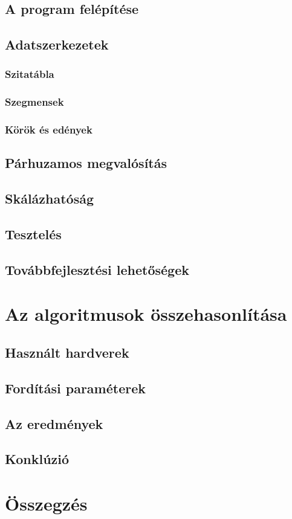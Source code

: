 \documentclass[twoside, a4paper, 12pt]{article}
\begin{document}
\subsection{A program felépítése}

\subsection{Adatszerkezetek}

\subsubsection{Szitatábla}
\subsubsection{Szegmensek}
\subsubsection{Körök és edények}

\subsection{Párhuzamos megvalósítás}

\subsection{Skálázhatóság}

\subsection{Tesztelés} \label{test}

\subsection{Továbbfejlesztési lehetőségek}

\clearpage
\section{Az algoritmusok összehasonlítása}

\subsection{Használt hardverek}

\subsection{Fordítási paraméterek} \label{optpar}

\subsection{Az eredmények} \label{benchmark}

\subsection{Konklúzió}

\clearpage
\section{Összegzés}
\end{document}
